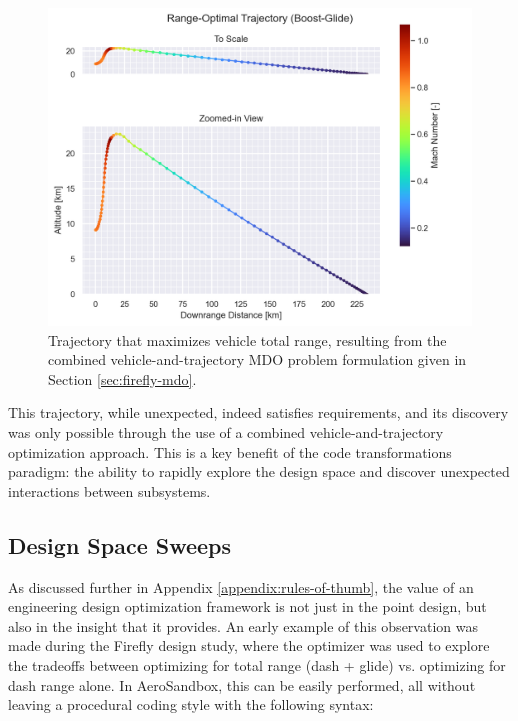\begin{figure}[H]
    \centering
    \includegraphics[width=\textwidth]{../figures/BAE-2022-06-17-Peter/ppt/media/image7.png}
    \caption{Trajectory that maximizes vehicle total range, resulting from the combined vehicle-and-trajectory MDO problem formulation given in Section \ref{sec:firefly-mdo}.}
    \label{fig:firefly_trajectory}
\end{figure}

This trajectory, while unexpected, indeed satisfies requirements, and its discovery was only possible through the use of a combined vehicle-and-trajectory optimization approach. This is a key benefit of the code transformations paradigm: the ability to rapidly explore the design space and discover unexpected interactions between subsystems.

\subsection{Design Space Sweeps}
\label{sec:firefly_sweeps}

As discussed further in Appendix \ref{appendix:rules-of-thumb}, the value of an engineering design optimization framework is not just in the point design, but also in the insight that it provides. An early example of this observation was made during the Firefly design study, where the optimizer was used to explore the tradeoffs between optimizing for total range (dash + glide) vs. optimizing for dash range alone. In AeroSandbox, this can be easily performed, all without leaving a procedural coding style with the following syntax:

